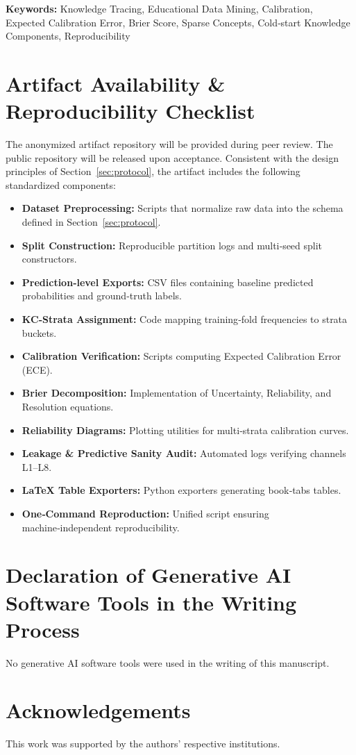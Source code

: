 \documentclass[12pt,a4paper]{article}
\begin{document}
\vspace{10pt}
\noindent\textbf{Keywords:} Knowledge Tracing, Educational Data Mining, Calibration, Expected Calibration Error, Brier Score, Sparse Concepts, Cold‑start Knowledge Components, Reproducibility








\section*{Artifact Availability \& Reproducibility Checklist}
The anonymized artifact repository will be provided during peer review. The public repository will be released upon acceptance. Consistent with the design principles of Section~\ref{sec:protocol}, the artifact includes the following standardized components:
\begin{itemize}
  \item \textbf{Dataset Preprocessing:} Scripts that normalize raw data into the schema defined in Section~\ref{sec:protocol}.
  \item \textbf{Split Construction:} Reproducible partition logs and multi‑seed split constructors.
  \item \textbf{Prediction‑level Exports:} CSV files containing baseline predicted probabilities and ground‑truth labels.
  \item \textbf{KC‑Strata Assignment:} Code mapping training‑fold frequencies to strata buckets.
  \item \textbf{Calibration Verification:} Scripts computing Expected Calibration Error (ECE).
  \item \textbf{Brier Decomposition:} Implementation of Uncertainty, Reliability, and Resolution equations.
  \item \textbf{Reliability Diagrams:} Plotting utilities for multi‑strata calibration curves.
  \item \textbf{Leakage \& Predictive Sanity Audit:} Automated logs verifying channels L1--L8.
  \item \textbf{LaTeX Table Exporters:} Python exporters generating book‑tabs tables.
  \item \textbf{One‑Command Reproduction:} Unified script ensuring machine‑independent reproducibility.
\end{itemize}

\section*{Declaration of Generative AI Software Tools in the Writing Process}
No generative AI software tools were used in the writing of this manuscript.

\section*{Acknowledgements}
This work was supported by the authors' respective institutions.




\appendix

\end{document}
